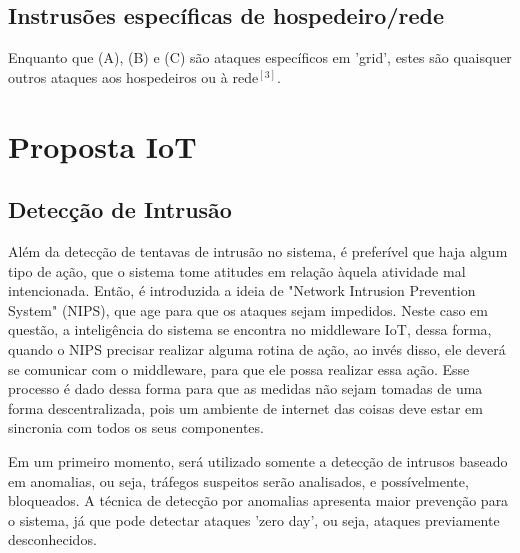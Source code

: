 \documentclass[journal]{IEEEtran}
\begin{document}
\subsection{Instrusões específicas de hospedeiro/rede}
Enquanto que (A), (B) e (C) são ataques específicos em 'grid', estes são quaisquer outros ataques aos hospedeiros ou à rede$^{ [3] }$.

\section{Proposta IoT}
\subsection{Detecção de Intrusão}
Além da detecção de tentavas de intrusão no sistema, é preferível que haja algum tipo de ação, que o sistema tome atitudes em relação àquela atividade mal intencionada. Então, é introduzida a ideia de "Network Intrusion Prevention System" (NIPS), que age para que os ataques sejam impedidos. Neste caso em questão, a inteligência do sistema se encontra no middleware IoT, dessa forma, quando o NIPS precisar realizar alguma rotina de ação, ao invés disso, ele deverá se comunicar com o middleware, para que ele possa realizar essa ação. Esse processo é dado dessa forma para que as medidas não sejam tomadas de uma forma descentralizada, pois um ambiente de internet das coisas deve estar em sincronia com todos os seus componentes. \par
Em um primeiro momento, será utilizado somente a detecção de intrusos baseado em anomalias, ou seja, tráfegos suspeitos serão analisados, e possívelmente, bloqueados. A técnica de detecção por anomalias apresenta maior prevenção para o sistema, já que pode detectar ataques 'zero day', ou seja, ataques previamente desconhecidos.
\end{document}
